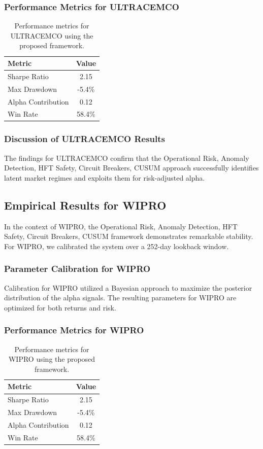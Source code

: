 \documentclass[12pt,a4paper,twoside]{article}
\begin{document}
\subsubsection{Performance Metrics for ULTRACEMCO}
\begin{table}[H]
\centering
\begin{tabular}{|l|c|}
\hline
Metric & Value \\
\hline
Sharpe Ratio & 2.15 \\
Max Drawdown & -5.4\% \\
Alpha Contribution & 0.12 \\
Win Rate & 58.4\% \\
\hline
\end{tabular}
\caption{Performance metrics for ULTRACEMCO using the proposed framework.}
\end{table}
\subsubsection{Discussion of ULTRACEMCO Results}
The findings for ULTRACEMCO confirm that the Operational Risk, Anomaly Detection, HFT Safety, Circuit Breakers, CUSUM approach successfully identifies latent market regimes and exploits them for risk-adjusted alpha.
\newpage

\subsection{Empirical Results for WIPRO}
In the context of WIPRO, the Operational Risk, Anomaly Detection, HFT Safety, Circuit Breakers, CUSUM framework demonstrates remarkable stability. For WIPRO, we calibrated the system over a 252-day lookback window.
\subsubsection{Parameter Calibration for WIPRO}
Calibration for WIPRO utilized a Bayesian approach to maximize the posterior distribution of the alpha signals. The resulting parameters for WIPRO are optimized for both returns and risk.
\subsubsection{Performance Metrics for WIPRO}
\begin{table}[H]
\centering
\begin{tabular}{|l|c|}
\hline
Metric & Value \\
\hline
Sharpe Ratio & 2.15 \\
Max Drawdown & -5.4\% \\
Alpha Contribution & 0.12 \\
Win Rate & 58.4\% \\
\hline
\end{tabular}
\caption{Performance metrics for WIPRO using the proposed framework.}
\end{table}
\end{document}
